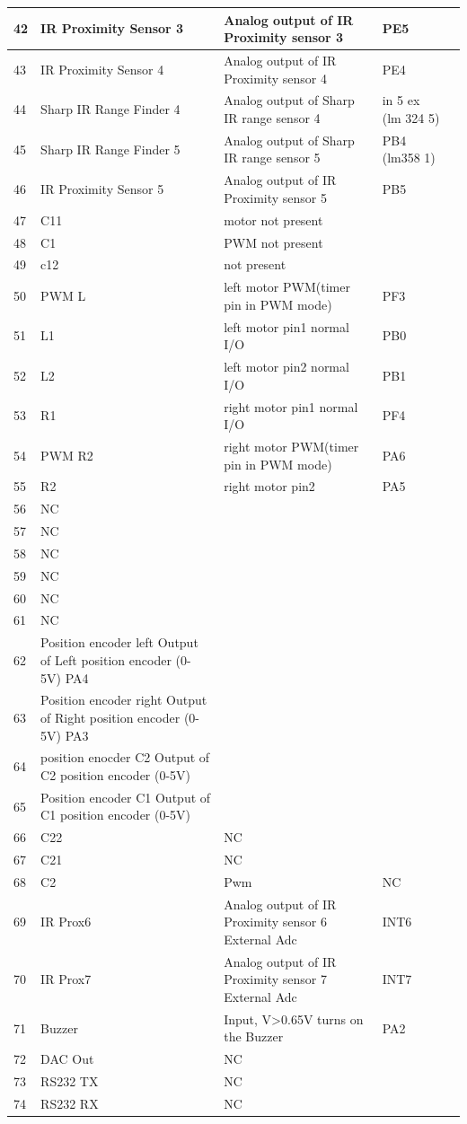 \documentclass[a4paper,10pt,oneside]{article}
\begin{document}
{\begin{longtable}{|p{}|p{}|p{}|p{}|p{}|}
				42&	IR Proximity Sensor 3&	Analog output of IR Proximity sensor 3	&PE5\\ \hline
				43&	IR Proximity Sensor 4&	Analog output of IR Proximity sensor 4&	PE4\\ \hline
				44&	Sharp IR Range Finder 4	&Analog output of Sharp IR range sensor 4&	in 5 ex (lm 324 5)\\ \hline
				45&	Sharp IR Range Finder 5&	Analog output of Sharp IR range sensor 5&	PB4 (lm358 1)\\ \hline
				46&	IR Proximity Sensor 5&	Analog output of IR Proximity sensor 5&	PB5\\ \hline
				47&	C11& motor 	not present&	\\ \hline
				48&	C1 &PWM	not present	&\\ \hline
				49&	c12&	not present	&\\ \hline
				50&	PWM L&	left motor PWM(timer pin in PWM mode)&	PF3\\ \hline
				51&	L1&	left motor pin1 normal I/O&	PB0\\ \hline
				52&	L2&	left motor pin2 normal I/O&	PB1\\ \hline
				53&	R1&	right motor pin1 normal I/O&	PF4\\ \hline
				54&	PWM R2&	right motor PWM(timer pin in PWM  mode)&	PA6\\ \hline
				55&	R2&	right motor pin2&	PA5\\ \hline
				56&	NC&&	\\ \hline	
				57&	NC&&	\\ \hline	
				58&	NC&&	\\ \hline	
				59&	NC&&	\\ \hline	
				60&	NC&&	\\ \hline	
				61&	NC	&&	\\ \hline
				62&	Position encoder left	Output of Left position encoder (0-5V)	PA4&&\\ \hline
				63&	Position encoder right 	Output of Right position encoder (0-5V)	PA3&&\\ \hline
				64&	position enocder C2	Output of C2 position encoder (0-5V)&&	\\ \hline
				65&	Position encoder C1	Output of C1 position encoder (0-5V)&&	\\ \hline
				66&	C22&	NC&	\\ \hline
				67&	C21	& NC&	\\ \hline
				68&	C2&Pwm&	NC	\\ \hline
				69&	IR Prox6&	Analog output of IR Proximity sensor 6	External Adc &INT6\\ \hline
				70&	IR Prox7&	Analog output of IR Proximity sensor 7	External Adc &INT7\\ \hline
				71&	Buzzer&	Input, V>0.65V turns on the Buzzer&	PA2\\ \hline
				72&	DAC Out&	NC&	\\ \hline
				73&	RS232 TX&	NC&	\\ \hline
				74&	RS232 RX&	NC&	\\ \hline


\end{longtable}}
\end{document}
